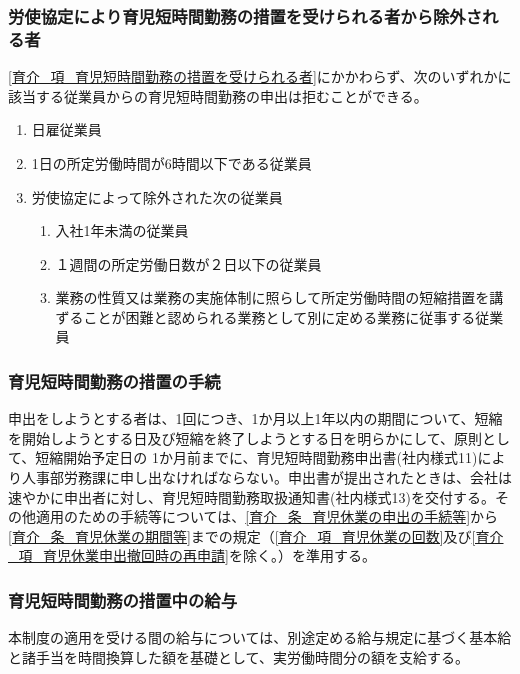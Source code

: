 \documentclass{jsarticle}
\begin{document}
\subsubsection{労使協定により育児短時間勤務の措置を受けられる者から除外される者}
\label{育介_項_労使協定により育児短時間勤務の措置を受けられる者から除外される者}
\ref{育介_項_育児短時間勤務の措置を受けられる者}にかかわらず、次のいずれかに該当する従業員からの育児短時間勤務の申出は拒むことができる。
\begin{enumerate}
  \item 日雇従業員
  \item 1日の所定労働時間が6時間以下である従業員
  \item 労使協定によって除外された次の従業員
    \begin{enumerate}
      \item 入社1年未満の従業員
      \item １週間の所定労働日数が２日以下の従業員
      \item 業務の性質又は業務の実施体制に照らして所定労働時間の短縮措置を講ずることが困難と認められる業務として別に定める業務に従事する従業員\label{enum:育介_項_労使協定により育児短時間勤務の措置を受けられる者から除外される者_困難者}
    \end{enumerate}
\end{enumerate}

\subsubsection{育児短時間勤務の措置の手続}
\label{育介_項_育児短時間勤務の措置の手続}
申出をしようとする者は、1回につき、1か月以上1年以内の期間について、短縮を開始しようとする日及び短縮を終了しようとする日を明らかにして、原則として、短縮開始予定日の 1か月前までに、育児短時間勤務申出書(社内様式11)により人事部労務課に申し出なければならない。申出書が提出されたときは、会社は速やかに申出者に対し、育児短時間勤務取扱通知書(社内様式13)を交付する。その他適用のための手続等については、\ref{育介_条_育児休業の申出の手続等}から\ref{育介_条_育児休業の期間等}までの規定（\ref{育介_項_育児休業の回数}及び\ref{育介_項_育児休業申出撤回時の再申請}を除く。）を準用する。

\subsubsection{育児短時間勤務の措置中の給与}
\label{育介_項_育児短時間勤務の措置中の給与}
本制度の適用を受ける間の給与については、別途定める給与規定に基づく基本給と諸手当を時間換算した額を基礎として、実労働時間分の額を支給する。
\end{document}
